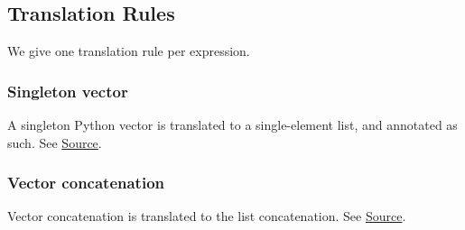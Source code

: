 \subsection{Translation Rules}

We give one translation rule per expression.

\subsubsection{Singleton vector}




\begin{mathpar}
\end{mathpar}

A singleton Python vector is translated to a single-element list, and annotated
as such. See
\href{https://github.com/saltiniroberto/ssf/blob/7ea6e18093d9da3154b4e396dd435549f687e6b9/high_level/common/pythonic_code_generic.py#L15-L16}{Source}.

\subsubsection{Vector concatenation}




\begin{mathpar}
\end{mathpar}

Vector concatenation is translated to the list concatenation. See
\href{https://github.com/saltiniroberto/ssf/blob/7ea6e18093d9da3154b4e396dd435549f687e6b9/high_level/common/pythonic_code_generic.py#L19-L20}{Source}.

